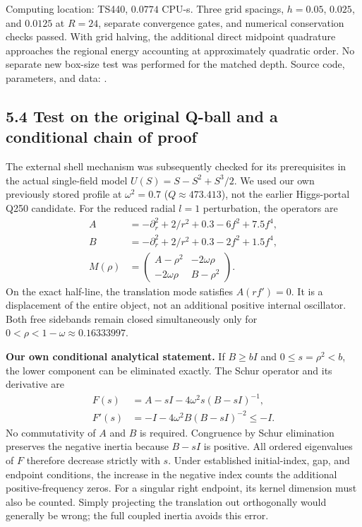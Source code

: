 \documentclass[a4paper,11pt]{article}
\begin{document}
Computing location: TS440, $0.0774$ CPU-s. Three grid spacings, $h=0.05$, $0.025$, and $0.0125$ at $R=24$, separate convergence gates, and numerical conservation checks passed. With grid halving, the additional direct midpoint quadrature approaches the regional energy accounting at approximately quadratic order. No separate new box-size test was performed for the matched depth. Source code, parameters, and data: .

\subsection*{5.4 Test on the original Q-ball and a conditional chain of proof}
The external shell mechanism was subsequently checked for its prerequisites in the actual single-field model $U(S)=S-S^2+S^3/2$. We used our own previously stored profile at $\omega^2=0.7$ ($Q\approx473.413$), not the earlier Higgs-portal Q250 candidate. For the reduced radial $l=1$ perturbation, the operators are
\begin{equation}
\begin{aligned}
A&=-\partial_r^2+2/r^2+0.3-6f^2+7.5f^4,\\
B&=-\partial_r^2+2/r^2+0.3-2f^2+1.5f^4,\\
M(\rho)&=\begin{pmatrix}A-\rho^2&-2\omega\rho\\-2\omega\rho&B-\rho^2\end{pmatrix}.
\end{aligned}\tag{14}
\end{equation}
On the exact half-line, the translation mode satisfies $A(rf')=0$. It is a displacement of the entire object, not an additional positive internal oscillator. Both free sidebands remain closed simultaneously only for $0<\rho<1-\omega\approx0.16333997$.

\textbf{Our own conditional analytical statement.} If $B\ge bI$ and $0\le s=\rho^2<b$, the lower component can be eliminated exactly. The Schur operator and its derivative are
\begin{equation}
\begin{aligned}
F(s)&=A-sI-4\omega^2s(B-sI)^{-1},\\
F'(s)&=-I-4\omega^2B(B-sI)^{-2}\le-I.
\end{aligned}\tag{15}
\end{equation}
No commutativity of $A$ and $B$ is required. Congruence by Schur elimination preserves the negative inertia because $B-sI$ is positive. All ordered eigenvalues of $F$ therefore decrease strictly with $s$. Under established initial-index, gap, and endpoint conditions, the increase in the negative index counts the additional positive-frequency zeros. For a singular right endpoint, its kernel dimension must also be counted. Simply projecting the translation out orthogonally would generally be wrong; the full coupled inertia avoids this error.
\end{document}
